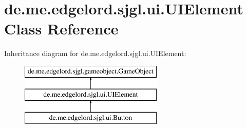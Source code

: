 \hypertarget{classde_1_1me_1_1edgelord_1_1sjgl_1_1ui_1_1_u_i_element}{}\section{de.\+me.\+edgelord.\+sjgl.\+ui.\+U\+I\+Element Class Reference}
\label{classde_1_1me_1_1edgelord_1_1sjgl_1_1ui_1_1_u_i_element}
Inheritance diagram for de.\+me.\+edgelord.\+sjgl.\+ui.\+U\+I\+Element\+:\begin{figure}[H]
\begin{center}
\leavevmode
\includegraphics[height=3.000000cm]{classde_1_1me_1_1edgelord_1_1sjgl_1_1ui_1_1_u_i_element}
\end{center}
\end{figure}
